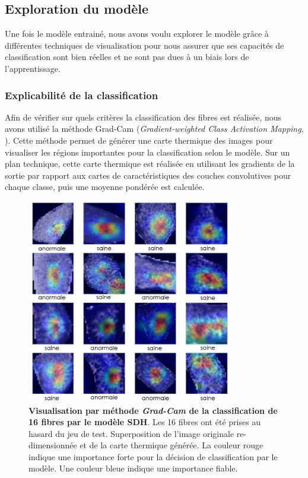 \subsection{Exploration du modèle}
Une fois le modèle entrainé, nous avons voulu explorer le modèle grâce à différentes techniques de visualisation pour nous assurer que ses capacités de classification sont bien réelles et ne sont pas dues à un biais lors de l'apprentissage.

\subsubsection{Explicabilité de la classification}
Afin de vérifier sur quels critères la classification des fibres est réalisée, nous avons utilisé la méthode Grad-Cam (\textit{Gradient-weighted Class Activation Mapping}, \cite{selvaraju_grad-cam_2020}). Cette méthode permet de générer une carte thermique des images pour visualiser les régions importantes pour la classification selon le modèle. Sur un plan technique, cette carte thermique est réalisée en utilisant les gradients de la sortie par rapport aux cartes de caractéristiques des couches convolutives pour chaque classe, puis une moyenne pondérée est calculée.

\begin{figure}[htbp]
 \centering
 \includegraphics[width=0.8\textwidth]{figures/sdh_gradcam.png}
 \caption[Visualisation par méthode \textit{Grad-Cam} du modèle SDH]{\textbf{Visualisation par méthode \textit{Grad-Cam} de la classification de 16 fibres par le modèle SDH}. Les 16 fibres ont été prises au hasard du jeu de test. Superposition de l'image originale re-dimensionnée et de la carte thermique générée. La couleur rouge indique une importance forte pour la décision de classification par le modèle. Une couleur bleue indique une importance fiable.}
 \label{fig:gradcam_sdh}
\end{figure}

